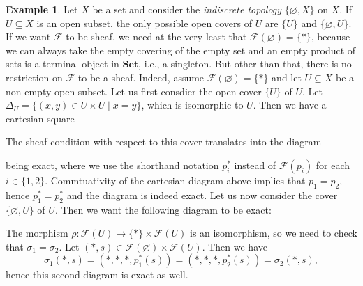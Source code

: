 \documentclass[12pt,reqno,a4paper]{amsart}
\theoremstyle{plain}
\theoremstyle{definition}
\newtheorem{exmp}[thm]{Example}
\theoremstyle{remark}
\begin{document}
\begin{exmp}\label{exmp:indiscretetopology}
  Let $X$ be a set and consider the \textit{indiscrete topology} $\{ \varnothing, X \}$ on $X$.
  If $U \subseteq X$ is an open subset, the only possible open covers of $U$ are $\{ U \}$ and $\{ \varnothing, U \}$.
  If we want $\mathscr{F}$ to be sheaf, we need at the very least that $\mathscr{F}(\varnothing) = \{ * \}$, because we can always take the empty covering of the empty set and an empty product of sets is a terminal object in $\mathbf{Set}$, i.e., a singleton.
  But other than that, there is no restriction on $\mathscr{F}$ to be a sheaf.
  Indeed, assume $\mathscr{F}(\varnothing) = \{ * \}$ and let $U \subseteq X$ be a non-empty open subset.
  Let us first consdier the open cover $\{ U \}$ of $U$.
  Let $\Delta_{U} = \{ (x,y) \in U \times U \mid x = y \}$, which is isomorphic to $U$.
  Then we have a cartesian square
  \begin{center}
  \end{center}
  The sheaf condition with respect to this cover translates into the diagram
  \begin{center}
  \end{center}
  being exact, where we use the shorthand notation $p_{i}^{*}$ instead of $\mathscr{F}(p_{i})$ for each $i \in \{ 1, 2 \}$.
  Commtuativity of the cartesian diagram above implies that $p_{1} = p_{2}$, hence $p_{1}^{*} = p_{2}^{*}$ and the diagram is indeed exact.
  Let us now consider the cover $\{ \varnothing, U \}$ of $U$.
  Then we want the following diagram to be exact:
  \begin{center}
  \end{center}
  The morphism $\rho \colon \mathscr{F}(U) \to \{ * \} \times \mathscr{F}(U)$ is an isomorphism, so we need to check that $\sigma_{1} = \sigma_{2}$.
  Let $(*,s) \in \mathscr{F}(\varnothing) \times \mathscr{F}(U)$.
  Then we have
  \[ \sigma_{1}(*,s) = (*,*,*,p_{1}^{*}(s)) = (*,*,*,p_{2}^{*}(s)) = \sigma_{2}(*,s), \]
  hence this second diagram is exact as well.


\end{exmp}
\end{document}
